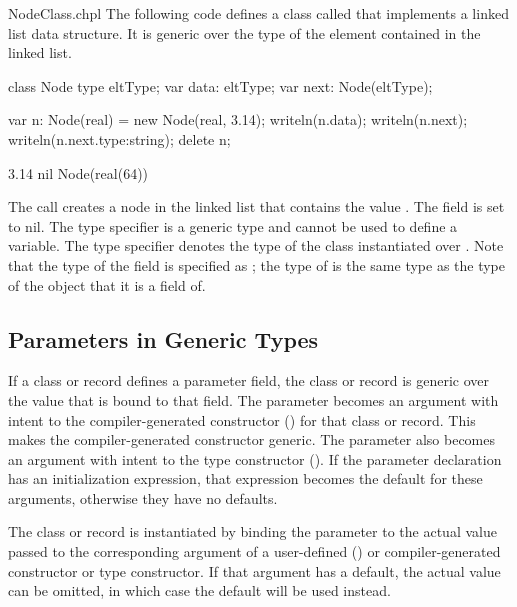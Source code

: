 \begin{chapelexample}{NodeClass.chpl}
The following code defines a class called  that implements
a linked list data structure.  It is generic over the type of the
element contained in the linked list.
\begin{chapel}
class Node {
  type eltType;
  var data: eltType;
  var next: Node(eltType);
}
\end{chapel}
\begin{chapelpost}
var n: Node(real) = new Node(real, 3.14);
writeln(n.data);
writeln(n.next);
writeln(n.next.type:string);
delete n;
\end{chapelpost}
\begin{chapeloutput}
3.14
nil
Node(real(64))
\end{chapeloutput}
The call  creates a node in the linked list
that contains the value .  The  field is set to
nil.  The type specifier  is a generic type and cannot be
used to define a variable.  The type specifier 
denotes the type of the  class instantiated over
.  Note that the type of the  field is specified
as ; the type of  is the same type as
the type of the object that it is a field of.
\end{chapelexample}

\subsection{Parameters in Generic Types}
\label{Parameters_in_Generic_Types}

If a class or record defines a parameter field, the class or record
is generic over the value that is bound to that field.
The parameter becomes an argument with intent  to the
compiler-generated constructor ()
for that class or record.  This makes the compiler-generated
constructor generic.  The parameter also becomes an argument
with intent  to the type  constructor ().
If the parameter declaration has an initialization expression, that expression
becomes the default for these arguments, otherwise they have no defaults.

The class or record is instantiated by binding the parameter
to the actual value passed to the corresponding argument of
a user-defined ()
or compiler-generated constructor or type constructor.
If that argument has a default, the actual value can be omitted, in
which case the default will be used instead.

